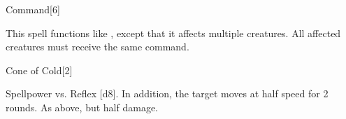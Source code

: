 \begin{spellsection}[Mass]{Command}[6]
    \begin{spellheader}
    \end{spellheader}
    \begin{spellcontent}
        \begin{spelltargetinginfo}
        \end{spelltargetinginfo}
        \begin{spelleffects}
            \spellspecial This spell functions like , except that it affects multiple creatures.
            All affected creatures must receive the same command.
        \end{spelleffects}
    \end{spellcontent}
    \begin{spellfooter}
        \miscastexplode
    \end{spellfooter}
\end{spellsection}

\begin{spellsection}{Cone of Cold}[2]
    \begin{spellheader}
    \end{spellheader}
    \begin{spellcontent}
        \begin{spelltargetinginfo}
        \end{spelltargetinginfo}
        \begin{spelleffects}
            \begin{spellattack}{Spellpower vs. Reflex}
                \spellsuccess {}[d8]. In addition, the target moves at half speed for 2 rounds.
                \spellfailure As above, but half damage.
            \end{spellattack}
        \end{spelleffects}
    \end{spellcontent}
    \begin{spellfooter}
        \miscastexplode
    \end{spellfooter}
\end{spellsection}


